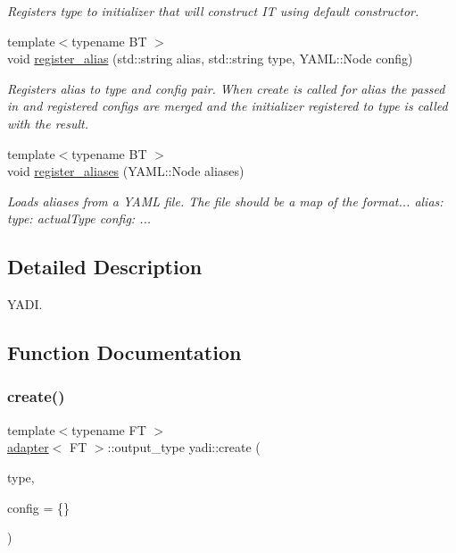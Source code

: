 \begin{DoxyCompactItemize}
$$\begin{DoxyCompactList}\small\item\em Registers type to initializer that will construct IT using default constructor. \end{DoxyCompactList}\item 
{\footnotesize template$<$typename BT $>$ }\\void \hyperlink{namespaceyadi_a5f8e048a8bef5792a7c5b3aae435999d}{register\+\_\+alias} (std\+::string alias, std\+::string type, Y\+A\+M\+L\+::\+Node config)
\begin{DoxyCompactList}\small\item\em Registers alias to type and config pair. When create is called for alias the passed in and registered configs are merged and the initializer registered to type is called with the result. \end{DoxyCompactList}\item 
{\footnotesize template$<$typename BT $>$ }\\void \hyperlink{namespaceyadi_a0879baf3dca6ee9a7d4387bfca43f8dd}{register\+\_\+aliases} (Y\+A\+M\+L\+::\+Node aliases)
\begin{DoxyCompactList}\small\item\em Loads aliases from a Y\+A\+ML file. The file should be a map of the format... alias\+: type\+: actual\+Type config\+: ... \end{DoxyCompactList}\end{DoxyCompactItemize}


\subsection{Detailed Description}
Y\+A\+DI. 

\subsection{Function Documentation}
\mbox{\label{namespaceyadi_ac39d8f532bdf81e833cb117160a6440a}} 
\subsubsection{\texorpdfstring{create()}{create()}}
{\footnotesize\ttfamily template$<$typename FT $>$ \\
\hyperlink{structyadi_1_1adapter}{adapter}$<$ FT $>$\+::output\+\_\+type yadi\+::create (\begin{DoxyParamCaption}\item[{std\+::string const \&}]{type,  }\item[{Y\+A\+M\+L\+::\+Node const \&}]{config = {\ttfamily \{\}} }\end{DoxyParamCaption})}



